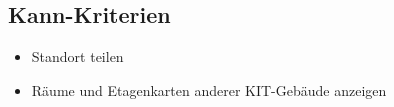 \subsection{Kann-Kriterien}

\begin{itemize}

    \item Standort teilen 
    \item Räume und Etagenkarten anderer KIT-Gebäude anzeigen

\end{itemize}